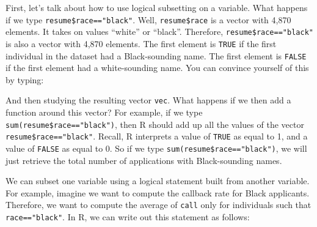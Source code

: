\documentclass[
]{book}
\newenvironment{Shaded}{\begin{snugshade}}{\end{snugshade}}
\newcommand{\DecValTok}[1]{\textcolor[rgb]{0.00,0.00,0.81}{#1}}
\newcommand{\FloatTok}[1]{\textcolor[rgb]{0.00,0.00,0.81}{#1}}
\newcommand{\FunctionTok}[1]{\textcolor[rgb]{0.13,0.29,0.53}{\textbf{#1}}}
\newcommand{\NormalTok}[1]{#1}
\newcommand{\OtherTok}[1]{\textcolor[rgb]{0.56,0.35,0.01}{#1}}
\newcommand{\SpecialCharTok}[1]{\textcolor[rgb]{0.81,0.36,0.00}{\textbf{#1}}}
\newcommand{\StringTok}[1]{\textcolor[rgb]{0.31,0.60,0.02}{#1}}
\begin{document}
First, let's talk about how to use logical subsetting on a variable. What happens if we type \texttt{resume\$race=="black"}. Well, \texttt{resume\$race} is a vector with 4,870 elements. It takes on values ``white'' or ``black''. Therefore, \texttt{resume\$race=="black"} is also a vector with 4,870 elements. The first element is \texttt{TRUE} if the first individual in the dataset had a Black-sounding name. The first element is \texttt{FALSE} if the first element had a white-sounding name. You can convince yourself of this by typing:

\begin{Shaded}
\end{Shaded}

And then studying the resulting vector \texttt{vec}. What happens if we then add a function around this vector? For example, if we type \texttt{sum(resume\$race=="black")}, then R should add up all the values of the vector \texttt{resume\$race=="black"}. Recall, R interprets a value of \texttt{TRUE} as equal to 1, and a value of \texttt{FALSE} as equal to 0. So if we type \texttt{sum(resume\$race=="black")}, we will just retrieve the total number of applications with Black-sounding names.

\begin{Shaded}
\end{Shaded}

We can subset one variable using a logical statement built from another variable. For example, imagine we want to compute the callback rate for Black applicants. Therefore, we want to compute the average of \texttt{call} only for individuals such that \texttt{race=="black"}. In R, we can write out this statement as follows:

\begin{Shaded}
\end{Shaded}
\end{document}
